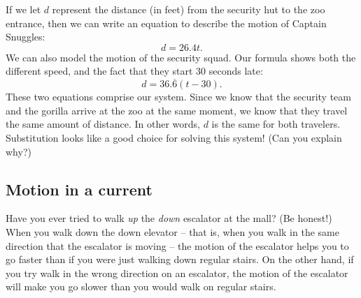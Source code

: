 If we let $d$ represent the distance (in feet) from the security hut to the zoo entrance, then we can write an equation to describe the motion of Captain Snuggles:
\[d = 26.4t.\]
We can also model the motion of the security squad. Our formula shows both the different speed, and the fact that they start 30 seconds late:
\[d=36.\overline{6}(t-30).\]
These two equations comprise our system. Since we know that the security team and the gorilla arrive at the zoo at the same moment, we know that they travel the same amount of distance. In other words, $d$ is the same for both travelers. Substitution looks like a good choice for solving this system! (Can you explain why?)

%
%
%


\subsection{Motion in a current}


Have you ever tried to walk \textit{up} the \textit{down} escalator at the mall? (Be honest!) When you walk down the down elevator -- that is, when you walk in the same direction that the escalator is moving -- the motion of the escalator helps you to go faster than if you were just walking down regular stairs. On the other hand, if you try walk in the wrong direction on an escalator, the motion of the escalator will make you go slower than you would walk on regular stairs.

